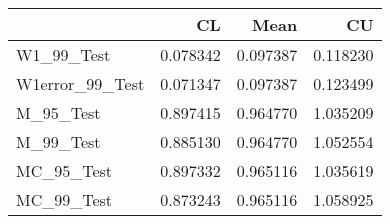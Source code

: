 \begin{tabular}{lrrr}
\toprule
{} &        CL &      Mean &        CU \\
\midrule
W1\_99\_Test      &  0.078342 &  0.097387 &  0.118230 \\
W1error\_99\_Test &  0.071347 &  0.097387 &  0.123499 \\
M\_95\_Test       &  0.897415 &  0.964770 &  1.035209 \\
M\_99\_Test       &  0.885130 &  0.964770 &  1.052554 \\
MC\_95\_Test      &  0.897332 &  0.965116 &  1.035619 \\
MC\_99\_Test      &  0.873243 &  0.965116 &  1.058925 \\
\bottomrule
\end{tabular}
